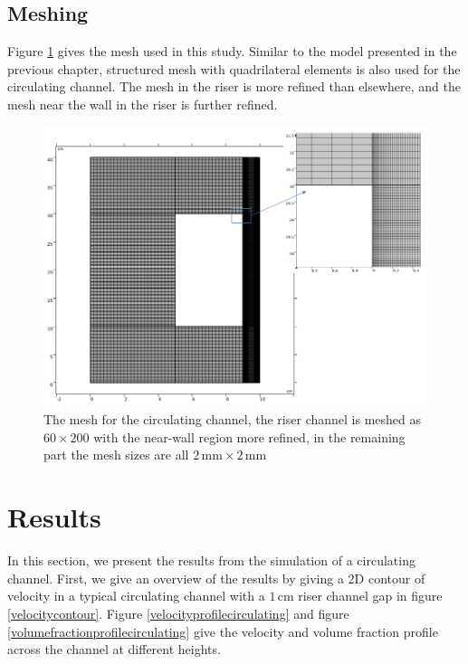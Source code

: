 \subsection{Meshing}

Figure \ref{Meshcirculating} gives the mesh used in this study. Similar to the model presented in the previous chapter, structured mesh with quadrilateral elements is also used for the circulating channel. The mesh in the riser is more refined than elsewhere, and the mesh near the wall in the riser is further refined.
\begin{figure}[H]
    \centering
    \includegraphics[scale = 0.8]{meshcirculatingchannel.png}
    \caption{The mesh for the circulating channel, the riser channel is meshed as $60 \times 200$ with the near-wall region more refined, in the remaining part the mesh sizes are all $2 \, \mathrm{mm} \times 2 \, \mathrm{mm}$}
    \label{Meshcirculating}
\end{figure}

 
 \section{Results}
 
In this section, we present the results from the simulation of a circulating channel. First, we give an overview of the results by giving a 2D contour of velocity in a typical circulating channel with a $1\, \mathrm{cm}$ riser channel gap in figure \ref{velocitycontour}. Figure \ref{velocityprofilecirculating} and figure \ref{volumefractionprofilecirculating} give the velocity and volume fraction profile across the channel at different heights. 


